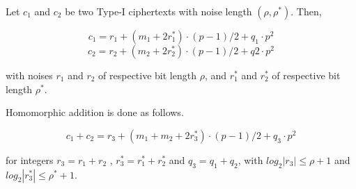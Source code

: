 \documentclass[../../main.tex]{subfiles}
\begin{document}
\noindent Let $c_1$ and $c_2$ be two Type-I ciphertexts with noise length $(\rho,\rho^*)$. Then,

\begin{equation*}
    c_1 = r_1 + (m_1 + 2r^*_1) \cdot (p-1)/2 + q_1 \cdot p^2
\end{equation*}
\begin{equation*}
    c_2 = r_2 + (m_2 + 2r^*_2) \cdot (p-1)/2 + q2 \cdot p^2
\end{equation*}

\noindent with noises $r_1$ and $r_2$ of respective bit length $\rho$, and $r^*_1$ and $r^*_2$ of respective bit length $\rho^*$.

\noindent Homomorphic addition is done as follows.

\begin{equation*}
    c_1 + c_2 = r_3 + (m_1 + m_2 + 2r^*_3) \cdot (p-1)/2 + q_3 \cdot p^2
\end{equation*}

\noindent for integers $r_3 = r_1 + r_2$ , $r^*_3 = r^*_1 + r^*_2$ and $q_3 = q_1 + q_2$, with $log_2|r_3| \leq \rho + 1$ and $log_2|r^*_3| \leq \rho^* + 1$.
\end{document}
